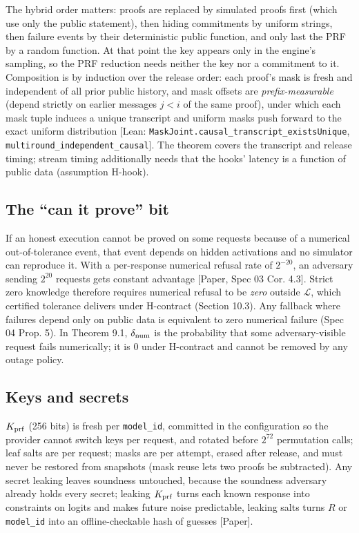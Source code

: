 \documentclass[10pt]{article}
\begin{document}
The hybrid order matters: proofs are replaced by simulated proofs first (which use only the public statement), then hiding commitments by uniform strings, then failure events by their deterministic public function, and only last the PRF by a random function. At that point the key appears only in the engine's sampling, so the PRF reduction needs neither the key nor a commitment to it. Composition is by induction over the release order: each proof's mask is fresh and independent of all prior public history, and mask offsets are \emph{prefix-measurable} (depend strictly on earlier messages $j<i$ of the same proof), under which each mask tuple induces a unique transcript and uniform masks push forward to the exact uniform distribution [Lean: \texttt{MaskJoint.\allowbreak{}causal\_\allowbreak{}transcript\_\allowbreak{}existsUnique}, \texttt{multiround\_\allowbreak{}independent\_\allowbreak{}causal}]. The theorem covers the transcript and release timing; stream timing additionally needs that the hooks' latency is a function of public data (assumption H-hook).

\subsection{The ``can it prove'' bit}
If an honest execution cannot be proved on some requests because of a numerical out-of-tolerance event, that event depends on hidden activations and no simulator can reproduce it. With a per-response numerical refusal rate of $2^{-20}$, an adversary sending $2^{20}$ requests gets constant advantage [Paper, Spec 03 Cor. 4.3]. Strict zero knowledge therefore requires numerical refusal to be \emph{zero} outside $\mathcal L$, which certified tolerance delivers under H-contract (Section 10.3). Any fallback where failures depend only on public data is equivalent to zero numerical failure (Spec 04 Prop. 5). In Theorem 9.1, $\delta_{\rm num}$ is the probability that some adversary-visible request fails numerically; it is 0 under H-contract and cannot be removed by any outage policy.

\subsection{Keys and secrets}
$K_{\rm prf}$ (256 bits) is fresh per \texttt{model\_\allowbreak{}id}, committed in the configuration so the provider cannot switch keys per request, and rotated before $2^{72}$ permutation calls; leaf salts are per request; masks are per attempt, erased after release, and must never be restored from snapshots (mask reuse lets two proofs be subtracted). Any secret leaking leaves soundness untouched, because the soundness adversary already holds every secret; leaking $K_{\rm prf}$ turns each known response into constraints on logits and makes future noise predictable, leaking salts turns $R$ or \texttt{model\_\allowbreak{}id} into an offline-checkable hash of guesses [Paper].
\end{document}
